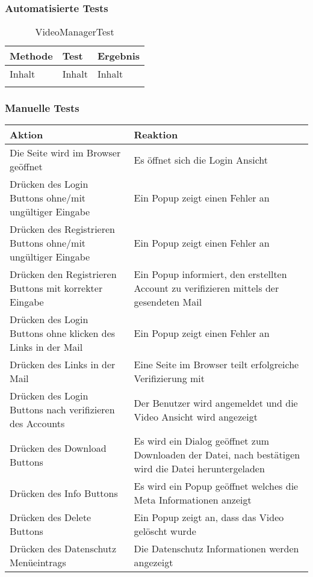 \subsubsection{Automatisierte Tests}
 \begin{longtable}{p{} | p{} | p{}}
\hline
  \textbf{Methode} & \textbf{Test} & \textbf{Ergebnis}\\
  \hline
  Inhalt & Inhalt & Inhalt\\
  \hline
  \caption{VideoManagerTest}
 \end{longtable}
\subsubsection{Manuelle Tests}

\begin{longtable}{p{} | p{}}
\hline
\textbf{Aktion} & \textbf{Reaktion}\\
\hline
Die Seite wird im Browser geöffnet & Es öffnet sich die Login Ansicht\\
\hline
Drücken des Login Buttons ohne/mit ungültiger Eingabe & Ein Popup zeigt einen Fehler an\\
\hline
Drücken des Registrieren Buttons ohne/mit ungültiger Eingabe& Ein Popup zeigt einen Fehler an\\
\hline
Drücken den Registrieren Buttons mit korrekter Eingabe & Ein Popup informiert, den erstellten Account zu verifizieren mittels der gesendeten Mail\\
\hline  
Drücken des Login Buttons ohne klicken des Links in der Mail & Ein Popup zeigt einen Fehler an\\
\hline  
Drücken des Links in der Mail & Eine Seite im Browser teilt erfolgreiche Verifizierung mit\\
\hline
Drücken des Login Buttons nach verifizieren des Accounts & Der Benutzer wird angemeldet und die Video Ansicht wird angezeigt\\
\hline
Drücken des Download Buttons & Es wird ein Dialog geöffnet zum Downloaden der Datei, nach bestätigen wird die Datei heruntergeladen\\
\hline
Drücken des Info Buttons & Es wird ein Popup geöffnet welches die Meta Informationen anzeigt\\
\hline
Drücken des Delete Buttons & Ein Popup zeigt an, dass das Video gelöscht wurde\\
\hline
Drücken des Datenschutz Menüeintrags & Die Datenschutz Informationen werden angezeigt\\

\end{longtable}
